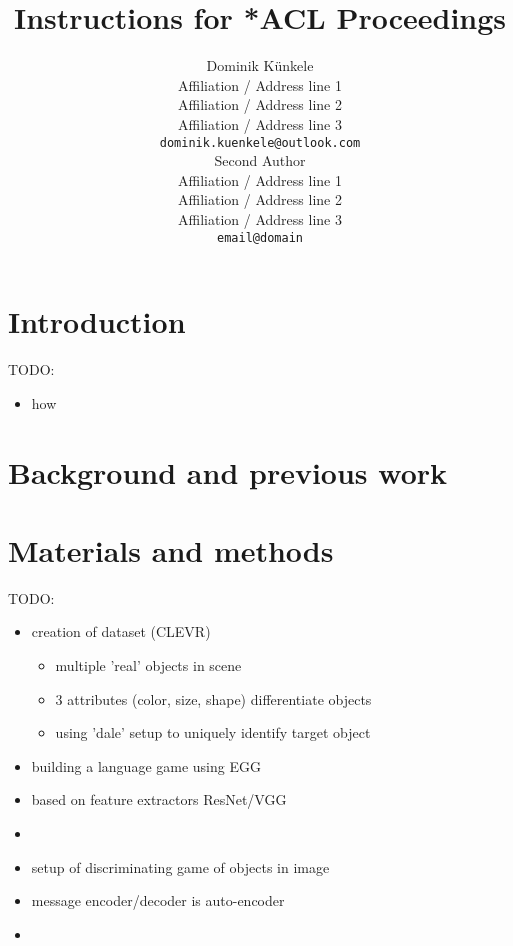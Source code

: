 \documentclass[11pt]{article}
\title{Instructions for *ACL Proceedings}
\author{Dominik Künkele \\
  Affiliation / Address line 1 \\
  Affiliation / Address line 2 \\
  Affiliation / Address line 3 \\
  \texttt{dominik.kuenkele@outlook.com} \\\And
  Second Author \\
  Affiliation / Address line 1 \\
  Affiliation / Address line 2 \\
  Affiliation / Address line 3 \\
  \texttt{email@domain} \\}
\begin{document}
\maketitle
\begin{abstract}

\end{abstract}

\section{Introduction}
TODO:
\begin{itemize}
  \item how
\end{itemize}
\section{Background and previous work}

\section{Materials and methods}
TODO:
\begin{itemize}
  \item creation of dataset (CLEVR)
        \begin{itemize}
          \item multiple 'real' objects in scene
          \item 3 attributes (color, size, shape) differentiate objects
          \item using 'dale' setup to uniquely identify target object
        \end{itemize}
  \item building a language game using EGG
  \item based on feature extractors ResNet/VGG
  \item
  \item setup of discriminating game of objects in image
  \item message encoder/decoder is auto-encoder
  \item
\end{itemize}
\end{document}

